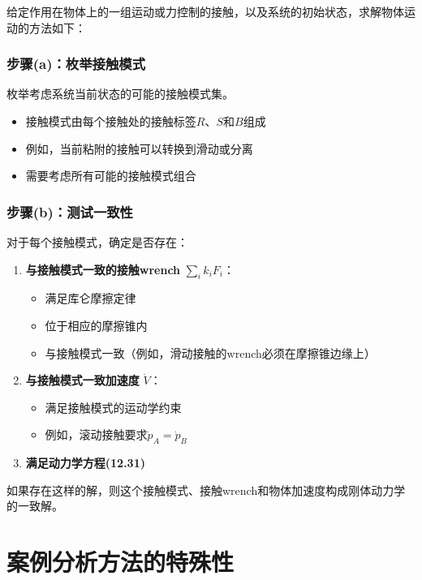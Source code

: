\documentclass[12pt,a4paper]{article}
\begin{document}
给定作用在物体上的一组运动或力控制的接触，以及系统的初始状态，求解物体运动的方法如下：

\subsubsection{步骤(a)：枚举接触模式}

枚举考虑系统当前状态的可能的接触模式集。

\begin{itemize}
    \item 接触模式由每个接触处的接触标签$R$、$S$和$B$组成
    \item 例如，当前粘附的接触可以转换到滑动或分离
    \item 需要考虑所有可能的接触模式组合
\end{itemize}

\subsubsection{步骤(b)：测试一致性}

对于每个接触模式，确定是否存在：

\begin{enumerate}
    \item \textbf{与接触模式一致的接触wrench} $\sum_i k_i F_i$：
    \begin{itemize}
        \item 满足库仑摩擦定律
        \item 位于相应的摩擦锥内
        \item 与接触模式一致（例如，滑动接触的wrench必须在摩擦锥边缘上）
    \end{itemize}
    
    \item \textbf{与接触模式一致加速度} $\dot{V}$：
    \begin{itemize}
        \item 满足接触模式的运动学约束
        \item 例如，滚动接触要求$\dot{p}_A = \dot{p}_B$
    \end{itemize}
    
    \item \textbf{满足动力学方程(12.31)}
\end{enumerate}

如果存在这样的解，则这个接触模式、接触wrench和物体加速度构成刚体动力学的一致解。

\section{案例分析方法的特殊性}
\end{document}
